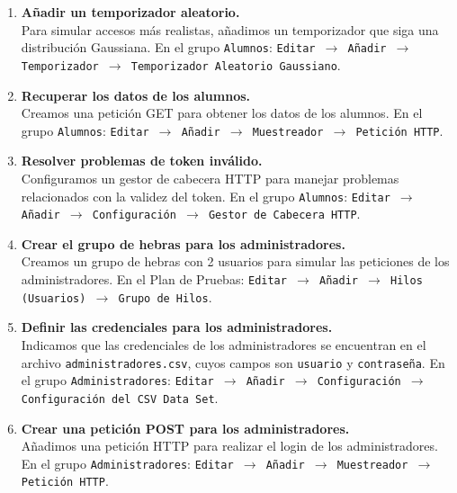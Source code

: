\begin{enumerate}
\begin{enumerate}
            \item \textbf{Añadir un temporizador aleatorio.} \\
            Para simular accesos más realistas, añadimos un temporizador que siga una distribución Gaussiana. En el grupo \texttt{Alumnos}: \texttt{Editar $\rightarrow$ Añadir $\rightarrow$ Temporizador $\rightarrow$ Temporizador Aleatorio Gaussiano}.

            \item \textbf{Recuperar los datos de los alumnos.} \\
            Creamos una petición GET para obtener los datos de los alumnos. En el grupo \texttt{Alumnos}: \texttt{Editar $\rightarrow$ Añadir $\rightarrow$ Muestreador $\rightarrow$ Petición HTTP}.

            \item \textbf{Resolver problemas de token inválido.} \\
            Configuramos un gestor de cabecera HTTP para manejar problemas relacionados con la validez del token. En el grupo \texttt{Alumnos}: \texttt{Editar $\rightarrow$ Añadir $\rightarrow$ Configuración $\rightarrow$ Gestor de Cabecera HTTP}.

            \item \textbf{Crear el grupo de hebras para los administradores.} \\
            Creamos un grupo de hebras con 2 usuarios para simular las peticiones de los administradores. En el Plan de Pruebas: \texttt{Editar $\rightarrow$ Añadir $\rightarrow$ Hilos (Usuarios) $\rightarrow$ Grupo de Hilos}.

            \item \textbf{Definir las credenciales para los administradores.} \\
            Indicamos que las credenciales de los administradores se encuentran en el archivo \texttt{administradores.csv}, cuyos campos son \texttt{usuario} y \texttt{contraseña}. En el grupo \texttt{Administradores}: \texttt{Editar $\rightarrow$ Añadir $\rightarrow$ Configuración $\rightarrow$ Configuración del CSV Data Set}.

            \item \textbf{Crear una petición POST para los administradores.} \\
            Añadimos una petición HTTP para realizar el login de los administradores. En el grupo \texttt{Administradores}: \texttt{Editar $\rightarrow$ Añadir $\rightarrow$ Muestreador $\rightarrow$ Petición HTTP}.


\end{enumerate}
\end{enumerate}
